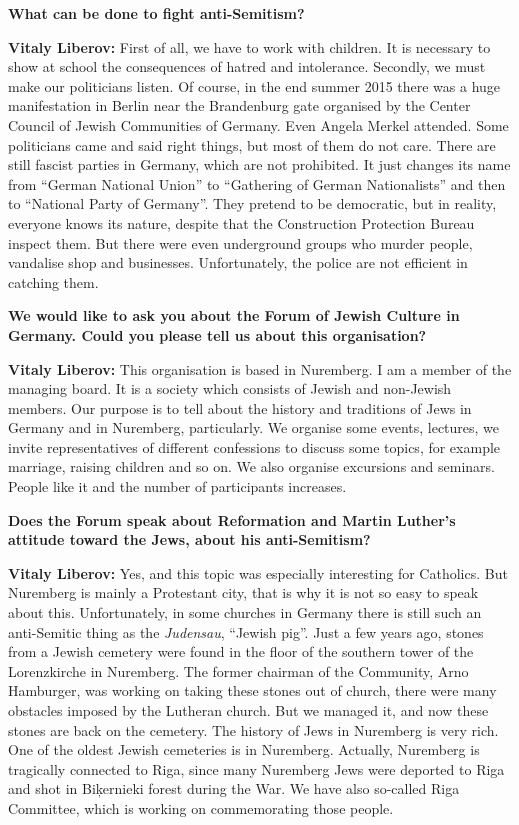 \textbf{What can be done to fight anti-Semitism?} 

\textbf{Vitaly Liberov:} First of all, we have to work with children. It is necessary to show at school the consequences of hatred and intolerance. Secondly, we must make our politicians listen. Of course, in the end summer 2015 there was a huge manifestation in Berlin near the Brandenburg gate organised by the Center Council of Jewish Communities of Germany. Even Angela Merkel attended. Some politicians came and said right things, but most of them do not care. There are still fascist parties in Germany, which are not prohibited. It just changes its name from “German National Union” to “Gathering of German Nationalists” and then to “National Party of Germany”. They pretend to be democratic, but in reality, everyone knows its nature, despite that the Construction Protection Bureau inspect them. But there were even underground groups who murder people, vandalise shop and businesses. Unfortunately, the police are not efficient in catching them. 

\textbf{We would like to ask you about the Forum of Jewish Culture in Germany. Could you please tell us about this organisation?}  

\textbf{Vitaly Liberov:} This organisation is based in Nuremberg. I am a member of the managing board. It is a society which consists of Jewish and non-Jewish members. Our purpose is to tell about the history and traditions of Jews in Germany and in Nuremberg, particularly. We organise some events, lectures, we invite representatives of different confessions to discuss some topics, for example marriage, raising children and so on. We also organise excursions and seminars. People like it and the number of participants increases.  

\textbf{Does the Forum speak about Reformation and Martin Luther’s attitude toward the Jews, about his anti-Semitism?} 

\textbf{Vitaly Liberov:} Yes, and this topic was especially interesting for Catholics. But Nuremberg is mainly a Protestant city, that is why it is not so easy to speak about this. Unfortunately, in some churches in Germany there is still such an anti-Semitic thing as the \textit{Judensau}, “Jewish pig”. Just a few years ago, stones from a Jewish cemetery were found in the floor of the southern tower of the Lorenzkirche in Nuremberg. The former chairman of the Community, Arno Hamburger, was working on taking these stones out of church, there were many obstacles imposed by the Lutheran church. But we managed it, and now these stones are back on the cemetery. The history of Jews in Nuremberg is very rich. One of the oldest Jewish cemeteries is in Nuremberg. Actually, Nuremberg is tragically connected to Riga, since many Nuremberg Jews were deported to Riga and shot in Biķernieki forest during the War. We have also so-called Riga Committee, which is working on commemorating those people.  